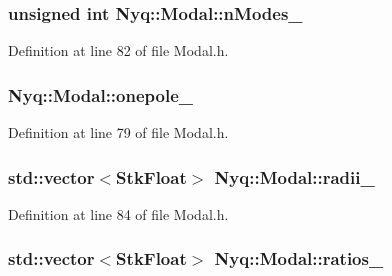 \subsubsection[{\texorpdfstring{n\+Modes\+\_\+}{nModes_}}]{\setlength{\rightskip}{0pt plus 5cm}unsigned {\bf int} Nyq\+::\+Modal\+::n\+Modes\+\_\+\hspace{0.3cm}{\ttfamily [protected]}}\hypertarget{class_nyq_1_1_modal_a6f8e4e25d265910c88565909fe27ebf0}{}\label{class_nyq_1_1_modal_a6f8e4e25d265910c88565909fe27ebf0}


Definition at line 82 of file Modal.\+h.

\subsubsection[{\texorpdfstring{onepole\+\_\+}{onepole_}}]{ Nyq\+::\+Modal\+::onepole\+\_\+\hspace{0.3cm}{\ttfamily [protected]}}\hypertarget{class_nyq_1_1_modal_a8e450a91ab3d648dc0fa7f2cebe39128}{}\label{class_nyq_1_1_modal_a8e450a91ab3d648dc0fa7f2cebe39128}


Definition at line 79 of file Modal.\+h.

\subsubsection[{\texorpdfstring{radii\+\_\+}{radii_}}]{\setlength{\rightskip}{0pt plus 5cm}std\+::vector$<${\bf Stk\+Float}$>$ Nyq\+::\+Modal\+::radii\+\_\+\hspace{0.3cm}{\ttfamily [protected]}}\hypertarget{class_nyq_1_1_modal_a2609b51fb75b92ad347713dc29e0750c}{}\label{class_nyq_1_1_modal_a2609b51fb75b92ad347713dc29e0750c}


Definition at line 84 of file Modal.\+h.

\subsubsection[{\texorpdfstring{ratios\+\_\+}{ratios_}}]{\setlength{\rightskip}{0pt plus 5cm}std\+::vector$<${\bf Stk\+Float}$>$ Nyq\+::\+Modal\+::ratios\+\_\+\hspace{0.3cm}{\ttfamily [protected]}}\hypertarget{class_nyq_1_1_modal_ab7c2e81d6ba5f9c427e33188ad530286}{}\label{class_nyq_1_1_modal_ab7c2e81d6ba5f9c427e33188ad530286}


